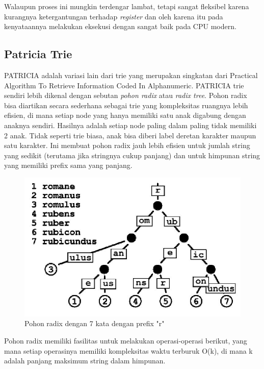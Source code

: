 Walaupun proses ini mungkin terdengar lambat, tetapi sangat fleksibel karena kurangnya ketergantungan terhadap \textit{register} dan oleh karena itu pada kenyataannya melakukan eksekusi dengan sangat baik pada CPU modern.

\subsection{Patricia Trie}
\label{sec:patriciaTrie}

PATRICIA adalah variasi lain dari trie yang merupakan singkatan dari Practical Algorithm To Retrieve Information Coded In Alphanumeric. PATRICIA trie sendiri lebih dikenal dengan sebutan \textit{pohon radix} atau \textit{radix tree}. Pohon radix bisa diartikan secara sederhana sebagai trie yang kompleksitas ruangnya lebih efisien, di mana setiap node yang hanya memiliki satu anak digabung dengan anaknya sendiri. Hasilnya adalah setiap node paling dalam paling tidak memiliki 2 anak. Tidak seperti trie biasa, anak bisa diberi label deretan karakter maupun satu karakter. Ini membuat pohon radix jauh lebih efisien untuk jumlah string yang sedikit (terutama jika stringnya cukup panjang) dan untuk himpunan string yang memiliki prefix sama yang panjang.

\begin{figure}[H]
\centering
\includegraphics[scale=0.75]{Gambar/contoh-radix-tree}
\caption[Trie]{Pohon radix dengan 7 kata dengan prefix "r"\cite{najogie:10:trie}} 
\label{contoh-radix-tree}
\end{figure}

Pohon radix memiliki fasilitas untuk melakukan operasi-operasi berikut, yang mana setiap operasinya memiliki kompleksitas waktu terburuk O(k), di mana k adalah panjang maksimum string dalam himpunan.

